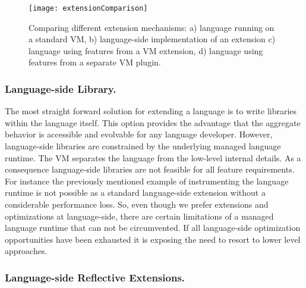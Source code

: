 
\begin{figure}
	\texttt{[image: extensionComparison]}
	\caption{Comparing different extension mechanisms: 
		a) language running on a standard VM, 
		b) language-side implementation of an extension
		c) language using features from a VM extension, 
		d) language using features from a separate VM plugin.}
\end{figure}
\vspace{-5mm}

\subsubsection{Language-side Library.}

The most straight forward solution for extending a language is to write libraries within the language itself. 
This option provides the advantage that the aggregate behavior is accessible and evolvable for any language developer.
However, language-side libraries are constrained by the underlying managed language runtime.
The VM separates the language from the low-level internal details.
As a consequence language-side libraries are not feasible for all feature requirements.
For instance the previously mentioned example of instrumenting the language runtime is not possible as a standard language-side extension without a considerable performance loss.
So, even though we prefer extensions and optimizations at language-side, there are certain limitations of a managed language runtime that can not be circumvented.
If all language-side optimization opportunities have been exhausted it is exposing the need to resort to lower level approaches.


\vspace{-2mm}
\subsubsection{Language-side Reflective Extensions.}


